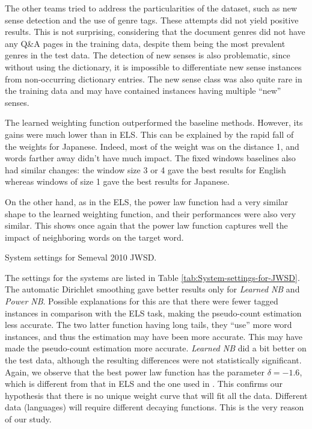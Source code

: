 \documentclass[english]{jnlp_1.4}
\begin{document}
The other teams tried to address the particularities of the dataset,
such as new sense detection and the use of genre tags. These attempts
did not yield positive results. This is not surprising, considering
that the document genres did not have any Q\&A pages in the training
data, despite them being the most prevalent genres in the test data.
The detection of new senses is also problematic, since without using
the dictionary, it is impossible to differentiate new sense instances
from non-occurring dictionary entries. The new sense class was also
quite rare in the training data and may have contained instances having
multiple {}``new'' senses.

The learned weighting function outperformed the baseline methods.
However, its gains were much lower than in ELS. This can be explained
by the rapid fall of the weights for Japanese. Indeed, most of the
weight was on the distance 1, and words farther away didn't have much
impact. The fixed windows baselines also had similar changes: the
window size 3 or 4 gave the best results for English whereas windows
of size 1 gave the best results for Japanese.

On the other hand, as in the ELS, the power law function had a very
similar shape to the learned weighting function, and their performances
were also very similar. This shows once again that the power law function
captures well the impact of neighboring words on the target word.

\begin{table}[t]
\caption{System settings for Semeval 2010 JWSD.}
\label{tab:System-settings-for-JWSD}

\end{table}

The settings for the systems are listed in Table \ref{tab:System-settings-for-JWSD}.
The automatic Dirichlet smoothing gave better results only for \emph{Learned}
\emph{NB} and \emph{Power NB}. Possible explanations for this are
that there were fewer tagged instances in comparison with the ELS
task, making the pseudo-count estimation less accurate. The two latter
function having long tails, they {}``use'' more word instances,
and thus the estimation may have been more accurate. This may have
made the pseudo-count estimation more accurate. \emph{Learned NB}
did a bit better on the test data, although the resulting differences
were not statistically significant. Again, we observe that the best
power law function has the parameter $\delta=-1.6$, which is different
from that in ELS and the one used in \cite{OhChoiWsdStaticDynamicVector}.
This confirms our hypothesis that there is no unique weight curve
that will fit all the data. Different data (languages) will require
different decaying functions. This is the very reason of our study. 
\end{document}
